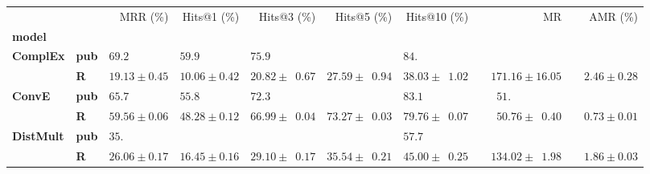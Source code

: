 \begin{tabular}{llrrrrrrr}
\toprule
       &   &                    MRR (\%) &                 Hits@1 (\%) &                            Hits@3 (\%) &                            Hits@5 (\%) &                           Hits@10 (\%) &                                        MR &                     AMR (\%) \\
\textbf{model} & {} &                             &                             &                                        &                                        &                                        &                                           &                              \\
\midrule
\textbf{ComplEx} & \textbf{pub} &  $69.2\phantom{0 \pm 0.00}$ &  $59.9\phantom{0 \pm 0.00}$ &            $75.9\phantom{0 \pm 00.00}$ &                                        &            $84.\phantom{00 \pm 00.00}$ &                                           &                              \\
       & \textbf{R} &            $19.13 \pm 0.45$ &            $10.06 \pm 0.42$ &            $20.82 \pm \phantom{0}0.67$ &            $27.59 \pm \phantom{0}0.94$ &            $38.03 \pm \phantom{0}1.02$ &            $\phantom{00}171.16 \pm 16.05$ &  $\phantom{00}2.46 \pm 0.28$ \\\midrule
\textbf{ConvE} & \textbf{pub} &  $65.7\phantom{0 \pm 0.00}$ &  $55.8\phantom{0 \pm 0.00}$ &            $72.3\phantom{0 \pm 00.00}$ &                                        &            $83.1\phantom{0 \pm 00.00}$ &  $\phantom{000}51.\phantom{00 \pm 00.00}$ &                              \\
       & \textbf{R} &            $59.56 \pm 0.06$ &            $48.28 \pm 0.12$ &            $66.99 \pm \phantom{0}0.04$ &            $73.27 \pm \phantom{0}0.03$ &            $79.76 \pm \phantom{0}0.07$ &  $\phantom{000}50.76 \pm \phantom{0}0.40$ &  $\phantom{00}0.73 \pm 0.01$ \\\midrule
\textbf{DistMult} & \textbf{pub} &  $35.\phantom{00 \pm 0.00}$ &                             &                                        &                                        &            $57.7\phantom{0 \pm 00.00}$ &                                           &                              \\
       & \textbf{R} &            $26.06 \pm 0.17$ &            $16.45 \pm 0.16$ &            $29.10 \pm \phantom{0}0.17$ &            $35.54 \pm \phantom{0}0.21$ &            $45.00 \pm \phantom{0}0.25$ &  $\phantom{00}134.02 \pm \phantom{0}1.98$ &  $\phantom{00}1.86 \pm 0.03$ \\\midrule

\end{tabular}
